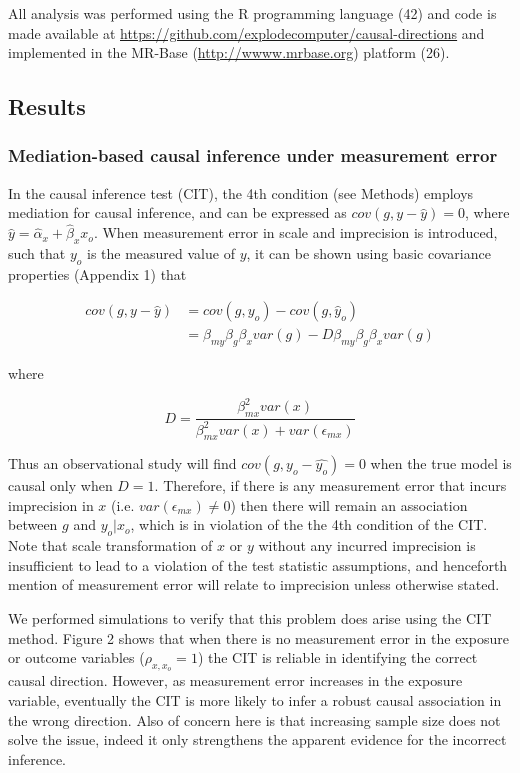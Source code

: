 \documentclass[]{article}
\begin{document}
All analysis was performed using the R programming language (42) and
code is made available at
\url{https://github.com/explodecomputer/causal-directions} and
implemented in the MR-Base (\url{http://wwww.mrbase.org}) platform (26).

\subsection{Results}\label{results}

\subsubsection{Mediation-based causal inference under measurement
error}\label{mediation-based-causal-inference-under-measurement-error}

In the causal inference test (CIT), the 4th condition (see Methods)
employs mediation for causal inference, and can be expressed as
\(cov(g, y - \hat{y}) = 0\), where
\(\hat{y} = \hat{\alpha}_x + \hat{\beta}_x x_o\). When measurement error
in scale and imprecision is introduced, such that \(y_o\) is the
measured value of \(y\), it can be shown using basic covariance
properties (Appendix 1) that

\[
\begin{aligned}
cov(g, y - \hat{y}) & = cov(g, y_o) - cov(g, \hat{y}_o)  \\
                    & = \beta_{my} \beta_g \beta_x var(g) - D \beta_{my} \beta_g \beta_x var(g)
\end{aligned}
\]

where

\[
D = \frac{\beta^2_{mx} var(x)} {\beta^2_{mx} var(x) + var(\epsilon_{mx})}
\]

Thus an observational study will find \(cov(g, y_o - \hat{y_o}) = 0\)
when the true model is causal only when \(D = 1\). Therefore, if there
is any measurement error that incurs imprecision in \(x\) (i.e.
\(var(\epsilon_{mx}) \neq 0\)) then there will remain an association
between \(g\) and \(y_o | x_o\), which is in violation of the the 4th
condition of the CIT. Note that scale transformation of \(x\) or \(y\)
without any incurred imprecision is insufficient to lead to a violation
of the test statistic assumptions, and henceforth mention of measurement
error will relate to imprecision unless otherwise stated.

We performed simulations to verify that this problem does arise using
the CIT method. Figure 2 shows that when there is no measurement error
in the exposure or outcome variables (\(\rho_{x, x_o}=1\)) the CIT is
reliable in identifying the correct causal direction. However, as
measurement error increases in the exposure variable, eventually the CIT
is more likely to infer a robust causal association in the wrong
direction. Also of concern here is that increasing sample size does not
solve the issue, indeed it only strengthens the apparent evidence for
the incorrect inference.
\end{document}
